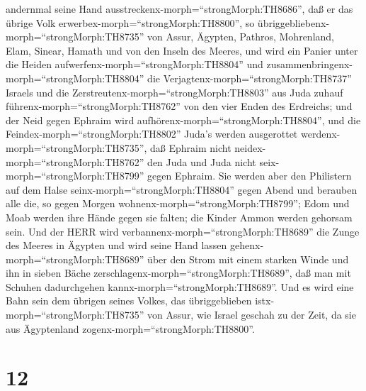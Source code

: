 andernmal seine Hand ausstreckenx-morph=``strongMorph:TH8686'', daß er
das übrige Volk erwerbex-morph=``strongMorph:TH8800'', so
übriggebliebenx-morph=``strongMorph:TH8735'' von Assur, Ägypten,
Pathros, Mohrenland, Elam, Sinear, Hamath und von den Inseln des Meeres,
 und wird ein Panier unter die Heiden
aufwerfenx-morph=``strongMorph:TH8804'' und
zusammenbringenx-morph=``strongMorph:TH8804'' die
Verjagtenx-morph=``strongMorph:TH8737'' Israels und die
Zerstreutenx-morph=``strongMorph:TH8803'' aus Juda zuhauf
führenx-morph=``strongMorph:TH8762'' von den vier Enden des Erdreichs;
 und der Neid gegen Ephraim wird
aufhörenx-morph=``strongMorph:TH8804'', und die
Feindex-morph=``strongMorph:TH8802'' Juda's werden ausgerottet
werdenx-morph=``strongMorph:TH8735'', daß Ephraim nicht
neidex-morph=``strongMorph:TH8762'' den Juda und Juda nicht
seix-morph=``strongMorph:TH8799'' gegen Ephraim.  Sie
werden aber den Philistern auf dem Halse
seinx-morph=``strongMorph:TH8804'' gegen Abend und berauben alle die, so
gegen Morgen wohnenx-morph=``strongMorph:TH8799''; Edom und Moab werden
ihre Hände gegen sie falten; die Kinder Ammon werden gehorsam sein.
 Und der HERR wird verbannenx-morph=``strongMorph:TH8689''
die Zunge des Meeres in Ägypten und wird seine Hand lassen
gehenx-morph=``strongMorph:TH8689'' über den Strom mit einem starken
Winde und ihn in sieben Bäche zerschlagenx-morph=``strongMorph:TH8689'',
daß man mit Schuhen dadurchgehen kannx-morph=``strongMorph:TH8689''.
 Und es wird eine Bahn sein dem übrigen seines Volkes, das
übriggeblieben istx-morph=``strongMorph:TH8735'' von Assur, wie Israel
geschah zu der Zeit, da sie aus Ägyptenland
zogenx-morph=``strongMorph:TH8800''.

\hypertarget{section-11}{%
\section{12}\label{section-11}}

